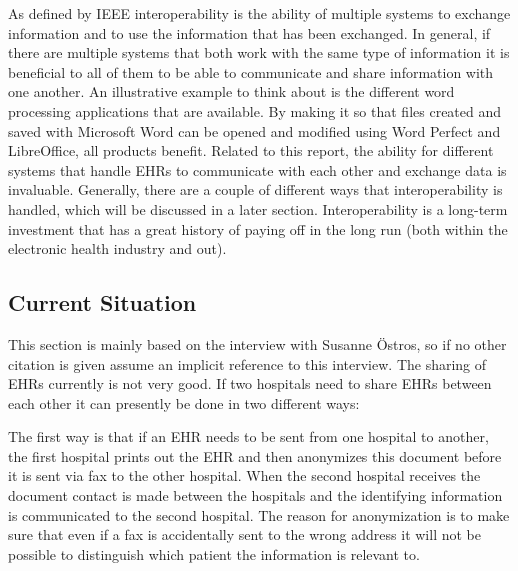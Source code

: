 \documentclass[14pt]{article}
\begin{document}

As defined by \gls{IEEE} interoperability is the ability of multiple systems to exchange information and to use the information that has been exchanged\cite{IEEE}.  In general, if there are multiple systems that both work with the same type of information it is beneficial to all of them to be able to communicate and share information with one another. An illustrative example to think about is the different word processing applications that are available. By making it so that files created and saved with Microsoft Word can be opened and modified using Word Perfect and LibreOffice, all products benefit.  Related to this report, the ability for different systems that handle \glspl{EHR} to communicate with each other and exchange data is invaluable.  Generally, there are a couple of different ways that interoperability is handled, which will be discussed in a later section.  Interoperability is a long-term investment that has a great history of paying off in the long run (both within the electronic health industry and out).

\subsection{Current Situation} %
\label{sec:interopCurrent}

This section is mainly based on the interview with Susanne Östros\cite{EPJ2}, so if no other citation is given assume an implicit reference to this interview.
The sharing of \glspl{EHR} currently is not very good. If two hospitals need to share \glspl{EHR} between each other it can presently be done in two different ways:

The first way is that if an \gls{EHR} needs to be sent from one hospital to another, the first hospital prints out the \gls{EHR} and then anonymizes this document before it is sent via fax to the other hospital. When the second hospital receives the document contact is made between the hospitals and the identifying information is communicated to the second hospital. The reason for anonymization is to make sure that even if a fax is accidentally sent to the wrong address it will not be possible to distinguish which patient the information is relevant to.
\end{document}
